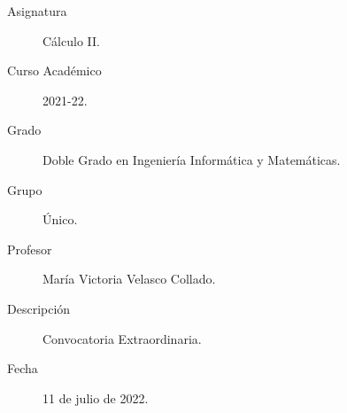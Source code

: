 \documentclass[12pt]{article}
\begin{document}

    
    

    \begin{description}
        \item[Asignatura] Cálculo II.
        \item[Curso Académico] 2021-22.
        \item[Grado] Doble Grado en Ingeniería Informática y Matemáticas.
        \item[Grupo] Único.
        \item[Profesor] María Victoria Velasco Collado.
        \item[Descripción] Convocatoria Extraordinaria.
        \item[Fecha] 11 de julio de 2022.
    
    \end{description}
    \newpage
    
\end{document}

